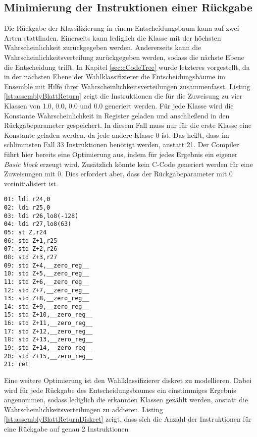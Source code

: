 \subsection{Minimierung der Instruktionen einer Rückgabe}
Die Rückgabe der Klassifizierung in einem Entscheidungsbaum kann auf zwei Arten stattfinden. Einerseits kann lediglich die Klasse mit der höchsten Wahrscheinlichkeit zurückgegeben werden. Andererseits kann die
Wahrscheinlichkeitsverteilung zurückgegeben werden, sodass die nächste Ebene die Entscheidung trifft. In Kapitel \ref{sec:cCodeTree} wurde letzteres vorgestellt, da in der nächsten Ebene der Wahlklassifizierer
die Entscheidungsbäume im Ensemble mit Hilfe ihrer Wahrscheinlichkeitsverteilungen zusammenfasst.
\newline
\newline
Listing \ref{lst:assemblyBlattReturn} zeigt die Instruktionen die für die Zuweisung zu vier Klassen von 1.0, 0.0, 0.0 und 0.0 generiert werden. Für jede Klasse wird die Konstante Wahrscheinlichkeit in Register geladen
und anschließend in den Rückgabeparameter gespeichert. In diesem Fall muss nur für die erste Klasse eine Konstante geladen werden, da jede andere Klasse 0 ist. Das heißt, dass im schlimmsten Fall 33
Instruktionen benötigt werden, anstatt 21. Der Compiler führt hier bereits eine Optimierung aus, indem für jedes Ergebnis ein eigener \textit{Basic block} erzeugt wird. Zusätzlich könnte kein C-Code generiert werden
für eine Zuweisungen mit 0. Dies erfordert aber, dass der Rückgabeparameter mit 0 vorinitialisiert ist.
\begin{lstlisting}[label=lst:assemblyBlattReturn,caption={Beispiel der Instruktionen einer Rückgabe der Wahrscheinlichkeitsverteilung eines Entscheidungsbaumes mit 4 Klassen.}]
01: ldi r24,0
02: ldi r25,0
03: ldi r26,lo8(-128)
04: ldi r27,lo8(63)
05: st Z,r24
06: std Z+1,r25
07: std Z+2,r26
08: std Z+3,r27
09: std Z+4,__zero_reg__
10: std Z+5,__zero_reg__
11: std Z+6,__zero_reg__
12: std Z+7,__zero_reg__
13: std Z+8,__zero_reg__
14: std Z+9,__zero_reg__
15: std Z+10,__zero_reg__
16: std Z+11,__zero_reg__
17: std Z+12,__zero_reg__
18: std Z+13,__zero_reg__
19: std Z+14,__zero_reg__
20: std Z+15,__zero_reg__
21: ret
\end{lstlisting}
Eine weitere Optimierung ist den Wahlklassifizierer diskret zu modellieren. Dabei wird für jede Rückgabe des Entscheidungsbaumes ein einstimmiges Ergebnis angenommen, sodass lediglich die erkannten Klassen
gezählt werden, anstatt die Wahrscheinlichkeitsverteilungen zu addieren. Listing \ref{lst:assemblyBlattReturnDiskret} zeigt, dass sich die Anzahl der Instruktionen für eine Rückgabe auf genau 2 Instruktionen
